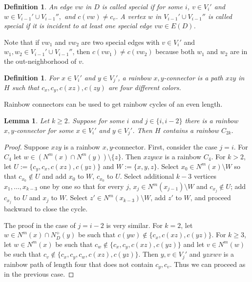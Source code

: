 \documentclass{article}
\newtheorem{defn}[theorem]{Definition}
\newtheorem{lemma}[theorem]{Lemma}
\begin{document}
 \begin{defn}
 An edge $vw$ in $D$ is called special if for some $i$, $v\in V_i'$ and $w\in V_{i-1}'\cup V_{i-1}'',$ and $c(vw) \neq c_v$. A vertex $w$ in $V_{i-1}'\cup V_{i-1}''$ is called special if it is incident to at least one special edge $vw\in E(D)$. 
 \end{defn}
 Note that if $vw_1$ and $vw_2$ are two special edges with $v\in V_i'$ and $w_1, w_2\in V_{i-1}'\cup V_{i-1}''$, then $c(vw_1)\neq c(vw_2)$ because both $w_1$ and $w_2$ are in the out-neighborhood of $v$. 

 \begin{defn}
For $x\in V_i'$ and $y\in V_j'$, a rainbow $x, y$-connector is a path $xzy$ in $H$ such that $c_x, c_y, c(xz), c(zy)$ are four different colors.
\end{defn}
Rainbow connectors can be used to get rainbow cycles of an even length.
 \begin{lemma}\label{ext-lem-path}
Let $k\geq 2$. Suppose for some $i$ and $j\in \{i, i-2\}$ there is a rainbow $x,y$-connector for some $x\in V_{i}'$ and $y\in V_j'$.  Then $H$ contains a rainbow $C_{2k}.$ 
\end{lemma}
\begin{proof}
Suppose $xzy$ is a rainbow $x,y$-connector.
First, consider the case $j=i$. For $C_4$ let $w\in (N^m(x)\cap N^m(y))\setminus \{z\}.$ Then $xzywx$ is a rainbow $C_4$. For $k>2$, let $U:= \{c_y, c_x, c(xz), c(yz)\}$ and $W:=\{x,y,z\}$. Select $x_0\in N^m(x)\setminus W$ so that $c_{x_0}\notin U$ and add $x_0$ to $W$, $c_{x_0}$ to $U$. Select additional $k-3$ vertices $x_1, \dots, x_{k-3}$ one by one so that for every $j$, $x_j\in N^m(x_{j-1})\setminus W$ and $c_{x_j}\notin U$; add $c_{x_j}$ to $U$ and $x_j$ to $W$. Select $z'\in N^m(x_{k-3})\setminus W$, add $z'$ to $W$, and 
proceed backward to close the cycle. %

The proof in the case of $j=i-2$ is very similar. For $k=2$, let $w\in N^m(x)\cap N^+_D(y)$ be such that $c(yw)\notin \{c_x, c(xz), c(yz)\}$. For $k\geq 3$, let $w\in N^m(x)$ be such that $c_w\notin \{c_x, c_y, c(xz), c(yz)\}$ and let $v\in N^m(w)$ be such that $c_v\notin \{c_x, c_y, c_w, c(xz), c(yz)\}$. Then $y,v \in V_j'$ and $yzxwv$ is a rainbow path of length four that does not contain $c_y, c_v$. Thus we can proceed as in the previous case.
\end{proof}
\end{document}
